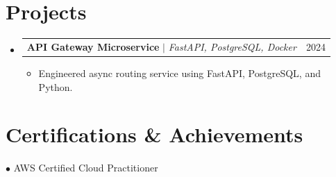 \documentclass[letterpaper,10pt]{article}
\makeatletter
\newcommand{\resumeItem}[1]{
  \item\small{
    {#1 \vspace{-2pt}}
  }
}
\newcommand{\resumeProjectHeading}[2]{
    \item
    \begin{tabular*}{0.97\textwidth}{l@{\extracolsep{\fill}}r}
      \small#1 & #2 \\
    \end{tabular*}\vspace{-7pt}
}
\newcommand{\resumeSubHeadingListStart}{\begin{itemize}[leftmargin=0.15in, label={}]}
\newcommand{\resumeSubHeadingListEnd}{\end{itemize}}
\newcommand{\resumeItemListStart}{\begin{itemize}}
\newcommand{\resumeItemListEnd}{\end{itemize}\vspace{-5pt}}
\makeatother
\begin{document}
\section{Projects}
    \resumeSubHeadingListStart
              \resumeProjectHeading
          {\textbf{API Gateway Microservice} $|$ \emph{FastAPI, PostgreSQL, Docker}}{2024}
          \resumeItemListStart
                          \resumeItem{Engineered async routing service using FastAPI, PostgreSQL, and Python.}
                      \resumeItemListEnd
          \resumeSubHeadingListEnd

\section{Certifications \& Achievements}
  \begin{itemize}[leftmargin=0.15in, label={}]
    \small{\item{
              $\bullet$ AWS Certified Cloud Practitioner \\
                }}
  \end{itemize}
\end{document}
